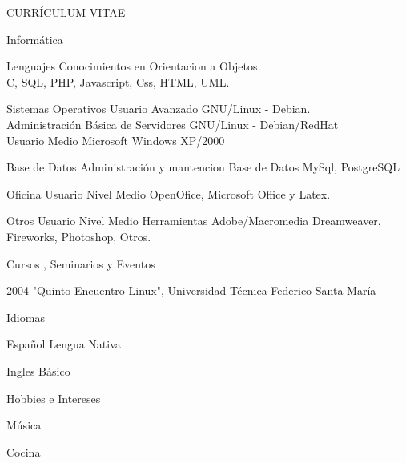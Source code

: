 \documentclass{article}
\begin{document}
\begin{cv}{CURR\'ICULUM VITAE}
\newpage	
\begin{cvlist}{Inform\'atica}
\item[Lenguajes] Conocimientos en Orientacion a Objetos.\\C, SQL, PHP, Javascript, Css, HTML, UML.
\item[Sistemas Operativos] Usuario Avanzado GNU/Linux - Debian.\\Administraci\'on B\'asica de Servidores GNU/Linux - Debian/RedHat\\Usuario Medio Microsoft Windows XP/2000
\item[Base de Datos]Administraci\'on y mantencion Base de Datos MySql, PostgreSQL
\item[Oficina] Usuario Nivel Medio OpenOfice, Microsoft Office y Latex.
\item[Otros] Usuario Nivel Medio Herramientas Adobe/Macromedia Dreamweaver, Fireworks, Photoshop, Otros.
\end{cvlist}

\begin{cvlist}{Cursos , Seminarios y Eventos}
\item[2004] "Quinto Encuentro Linux", Universidad T\'ecnica Federico Santa Mar\'ia
\end{cvlist}

\begin{cvlist}{Idiomas}
\item[] Espa\~nol Lengua Nativa
\item[] Ingles B\'asico
\end{cvlist}

\begin{cvlist}{Hobbies e Intereses}
\item M\'usica
\item Cocina
\end{cvlist}

\vspace{2cm}
\end{cv}
\end{document}
